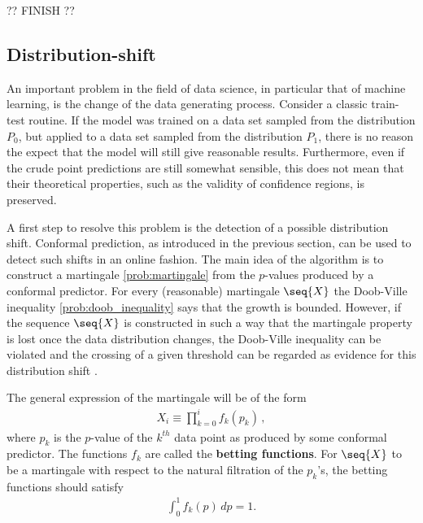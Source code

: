    ?? FINISH ??

\subsection{Distribution-shift}

    An important problem in the field of data science, in particular that of machine learning, is the change of the data generating process. Consider a classic train-test routine. If the model was trained on a data set sampled from the distribution $P_0$, but applied to a data set sampled from the distribution $P_1$, there is no reason the expect that the model will still give reasonable results. Furthermore, even if the crude point predictions are still somewhat sensible, this does not mean that their theoretical properties, such as the validity of confidence regions, is preserved.

    A first step to resolve this problem is the detection of a possible distribution shift. Conformal prediction, as introduced in the previous section, can be used to detect such shifts in an online fashion. The main idea of the algorithm is to construct a martingale \ref{prob:martingale} from the $p$-values produced by a conformal predictor. For every (reasonable) martingale $\seq{X}$ the Doob-Ville inequality \ref{prob:doob_inequality} says that the growth is bounded. However, if the sequence $\seq{X}$ is constructed in such a way that the martingale property is lost once the data distribution changes, the Doob-Ville inequality can be violated and the crossing of a given threshold can be regarded as evidence for this distribution shift \cite{cp_all}.

    The general expression of the martingale will be of the form
    \begin{gather}
        X_i\equiv\prod_{k=0}^if_k(p_k)\,,
    \end{gather}
    where $p_k$ is the $p$-value of the $k^{th}$ data point as produced by some conformal predictor. The functions $f_k$ are called the \textbf{betting functions}. For $\seq{X}$ to be a martingale with respect to the natural filtration of the $p_k$'s, the betting functions should satisfy
    \begin{gather}
        \int_0^1f_k(p)\,dp = 1.
    \end{gather}

